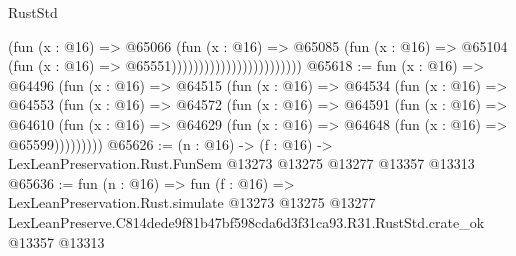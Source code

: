 \begin{lexlean}{RustStd}
\begin{coremodule}
                                            (fun (x : @16) =>
                                            @65066
                                              (fun (x : @16) =>
                                              @65085
                                                (fun (x : @16) =>
                                                @65104
                                                  (fun (x : @16) => @65551))))))))))))))))))))))))
@65618 := fun (x : @16) =>
  @64496
    (fun (x : @16) =>
    @64515
      (fun (x : @16) =>
      @64534
        (fun (x : @16) =>
        @64553
          (fun (x : @16) =>
          @64572
            (fun (x : @16) =>
            @64591
              (fun (x : @16) =>
              @64610
                (fun (x : @16) => @64629 (fun (x : @16) => @64648 (fun (x : @16) => @65599)))))))))
@65626 := (n : @16) ->
  (f : @16) -> LexLeanPreservation.Rust.FunSem @13273 @13275 @13277 @13357 @13313
@65636 := fun (n : @16) =>
  fun (f : @16) =>
  LexLeanPreservation.Rust.simulate
    @13273
    @13275
    @13277
    LexLeanPreserve.C814dede9f81b47bf598cda6d3f31ca93.R31.RustStd.crate_ok
    @13357
    @13313
\end{coremodule}
\end{lexlean}
